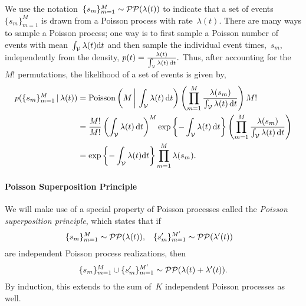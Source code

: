 We use the notation~${\{s_m\}_{m=1}^M\sim\mathcal{PP}(\lambda(t))}$ to indicate
that a set of events~$\{s_m\}_{m=1}^M$ is drawn from a Poisson process
with rate~$\lambda(t)$. There are many ways to sample a Poisson
process; one way is to first sample a Poisson number of events with
mean~${\int_{\mathcal{V}} \lambda(t) \mathrm{d}t}$ and then sample the individual
event times,~$s_m$, independently from the density,
${
  p(t) = \frac{\lambda(t)}{\int_{\mathcal{V}} \lambda(t) \, \mathrm{d}t}.
}$
Thus, after accounting for the~$M!$ permutations,
the likelihood of a set of events is given by,
\begin{align}
  \nonumber
  p(\{s_m\}_{m=1}^M \,|\, \lambda(t))
  &= \mathrm{Poisson} \left(M \, \bigg| \, \int_{\mathcal{V}} \lambda(t) \, \mathrm{d} t \right)
  \left( \prod_{m=1}^M \frac{\lambda(s_m)}{\int_{\mathcal{V}} \lambda(t) \, \mathrm{d}t} \right)  M! \\
  \nonumber
  &= \frac{M!}{M!} \left(\int_{\mathcal{V}} \lambda(t) \, \mathrm{d} t \right)^M
  \exp \left \{-\int_{\mathcal{V}} \lambda(t) \, \mathrm{d} t \right \} 
  \left( \prod_{m=1}^M \frac{\lambda(s_m)}{\int_{\mathcal{V}} \lambda(t) \, \mathrm{d}t} \right) \\
  \label{eq:poisson_lkhd}
  &=\exp\left\{-\int_{\mathcal{V}}\lambda(t)\mathrm{d}t \right\}
  \prod_{m=1}^M\lambda(s_m).
\end{align}

\paragraph{Poisson Superposition Principle}
We will make use of a special property of Poisson processes called the
\emph{Poisson superposition principle}, which states that if
\begin{align*}
  \{s_{m}\}_{m=1}^{M} &\sim \mathcal{PP}(\lambda(t)), & 
  \{s'_{m}\}_{m=1}^{M'} &\sim \mathcal{PP}(\lambda'(t))
\end{align*}
are independent Poisson process realizations, then
\begin{align*}
\{s_{m}\}_{m=1}^{M} \cup \{s'_{m}\}_{m=1}^{M'} \sim \mathcal{PP}(\lambda(t)+\lambda'(t)).
\end{align*}
By induction, this extends to the sum of~$K$ independent Poisson
processes as well.

